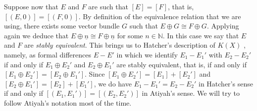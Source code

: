 \documentclass[12pt,a4paper]{amsart}
\theoremstyle{plain}
\theoremstyle{definition}
\theoremstyle{remark}
\begin{document}
Suppose now that $E$ and $F$ are such that $[E] = [F]$, that is, $[(E,0)] = [(F,0)]$.
By definition of the equivalence relation that we are using, there exists some vector bundle $G$ such that $E \oplus G \cong F \oplus G$.
Applying \cite[Corollary 1.4.14]{ati67} again we deduce that $E \oplus \underline{n} \cong F \oplus \underline{n}$ for some $n \in \mathbb{N}$.
In this case we say that $E$ and $F$ are \textit{stably equivalent}.
This brings us to Hatcher's description of $K(X)$ \cite[p.~39]{hat03}, namely, as formal differences $E - E'$ in which we identify $E_{1} - E_{1}'$ with $E_{2} - E_{2}'$ if and only if $E_{1} \oplus E_{2}'$ and $E_{2} \oplus E_{1}'$ are stably equivalent, that is, if and only if $[E_{1} \oplus E_{2}'] = [E_{2} \oplus E_{1}']$.
Since $[E_{1} \oplus E_{2}'] = [E_{1}] + [E_{2}']$ and $[E_{2} \oplus E_{1}'] = [E_{2}] + [E_{1}']$, we do have $E_{1} - E_{1}' = E_{2} - E_{2}'$ in Hatcher's sense if and only if $[(E_{1},E_{1}')] = [(E_{2},E_{2}')]$ in Atiyah's sense.
We will try to follow Atiyah's notation most of the time.



\vfill
\end{document}
